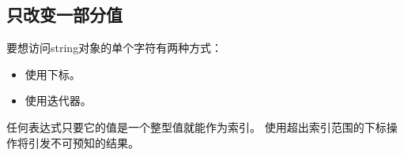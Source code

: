\subsection{只改变一部分值}
要想访问string对象的单个字符有两种方式：
\begin{itemize}
\item{使用下标。}
\item{使用迭代器。}
\end{itemize}
任何表达式只要它的值是一个整型值就能作为索引。%
使用超出索引范围的下标操作将引发不可预知的结果。%
